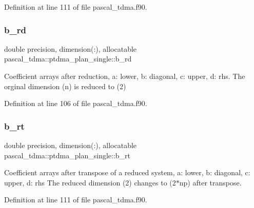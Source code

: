 Definition at line 111 of file pascal\+\_\+tdma.\+f90.

\mbox{\label{structpascal__tdma_1_1ptdma__plan__single_acf24e954fa50a47ece2c59598b81c157}} 
\subsubsection{\texorpdfstring{b\_rd}{b\_rd}}
{\footnotesize\ttfamily double precision, dimension(\+:), allocatable pascal\+\_\+tdma\+::ptdma\+\_\+plan\+\_\+single\+::b\+\_\+rd}



Coefficient arrays after reduction, a\+: lower, b\+: diagonal, c\+: upper, d\+: rhs. The orginal dimension (n) is reduced to (2) 



Definition at line 106 of file pascal\+\_\+tdma.\+f90.

\mbox{\label{structpascal__tdma_1_1ptdma__plan__single_a8e9487525ccef0d45c8a5440103613b0}} 
\subsubsection{\texorpdfstring{b\_rt}{b\_rt}}
{\footnotesize\ttfamily double precision, dimension(\+:), allocatable pascal\+\_\+tdma\+::ptdma\+\_\+plan\+\_\+single\+::b\+\_\+rt}



Coefficient arrays after transpose of a reduced system, a\+: lower, b\+: diagonal, c\+: upper, d\+: rhs The reduced dimension (2) changes to (2$\ast$np) after transpose. 



Definition at line 111 of file pascal\+\_\+tdma.\+f90.

\mbox{\label{structpascal__tdma_1_1ptdma__plan__single_a9450979ebd66ed321f27165c8e13629f}} 

